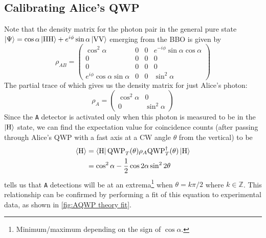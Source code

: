 \documentclass{paper}[11pt]
\begin{document}
	\subsection{Calibrating Alice's QWP}
	Note that the density matrix for the photon pair in the general pure state $\ket{\Psi}=\cos\alpha\ket{\text{HH}} + e^{i\phi}\sin\alpha\ket{\text{VV}}$ emerging from the BBO is given by
	\begin{equation}
		\rho_{AB} = \begin{pmatrix}
			\cos^2\alpha & 0 & 0 & e^{-i\phi}\sin\alpha\cos\alpha \\
			0 & 0 & 0 & 0 \\
			0 & 0 & 0 & 0 \\
			e^{i\phi}\cos\alpha\sin\alpha & 0 & 0 & \sin^2\alpha
		\end{pmatrix}
	\end{equation}
	The partial trace of which gives us the density matrix for just Alice's photon:
	\begin{equation}
		\rho_A = \begin{pmatrix}
			\cos^2\alpha & 0 \\ 0 & \sin^2\alpha
		\end{pmatrix}
	\end{equation}
	Since the \texttt{A} detector is activated only when this photon is measured to be in the $\ket{\text{H}}$ state, we can find the expectation value for coincidence counts (after passing through Alice's QWP with a fast axis at a CW angle $\theta$ from the vertical) to be
	\begin{align}
		{\langle{\text{H}}\rangle} &= \bra{\text{H}}\text{\rmfamily QWP\normalfont}_T(\theta)\rho_A\text{\rmfamily QWP\normalfont}_T^\dagger(\theta)\ket{\text{H}} \\
		&= \cos^2\alpha - \frac{1}{2}\cos2\alpha\sin^22\theta \label{eq:alice QWP H counts}
	\end{align}
	 tells us that \texttt{A} detections will be at an extrema\footnote{Minimum/maximum depending on the sign of $\cos\alpha$.} when $\theta=k\pi/2$ where $k\in\mathbb{Z}$. This relationship can be confirmed by performing a fit of this equation to experimental data, as shown in \cref{fig:AQWP theory fit}.
\end{document}
